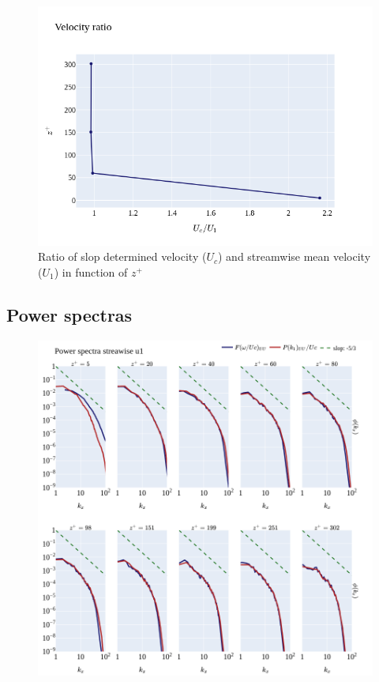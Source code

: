 \documentclass[]{article}
\theoremstyle{plain}
\theoremstyle{remark}
\begin{document}
\begin{figure}[h!]
	\begin{center}
		\includegraphics[width=\textwidth]{../output/channel_wrles_retau395/split_time/frozen_turbulence/correlation2D/u_ratio.png}
		\caption{Ratio of slop determined velocity ($U_c$) and streamwise mean velocity ($U_1$) in function of $z^+$}
	\end{center}
\end{figure}

\subsection{Power spectras}

\begin{figure}[h!]
	\begin{center}
		\includegraphics[width=\textwidth]{../output/channel_wrles_retau395/split_time/frozen_turbulence/power_spectra/u1_all.png}
	\end{center}
\end{figure}
\end{document}
